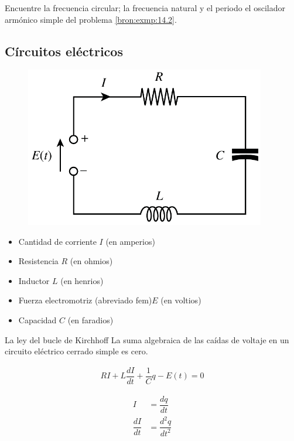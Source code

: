 \begin{problema}
	Encuentre la frecuencia circular; la frecuencia natural y el periodo el oscilador arm\'onico simple del problema \ref{bron:exmp:14.2}.
\end{problema}



\subsection{Círcuitos eléctricos}


\begin{figure}
	\includegraphics[height=7cm,keepaspectratio=true]{./edo/circuitos_electricos.png}
	\label{fig:circuitos}
\end{figure}



{}
\begin{itemize}
	\item Cantidad de corriente $I$ (en amperios)
	\item Resistencia $R$ (en ohmios)
	\item Inductor $L$ (en henrios)
	\item Fuerza electromotriz (abreviado fem)$E$ (en voltios)
	\item Capacidad $C$ (en faradios)
\end{itemize}


{La ley del bucle de Kirchhoff}	
La suma algebraica de las caídas de voltaje en un circuito eléctrico cerrado simple es cero.


{}
\begin{align*}
	RI + L\dfrac{dI}{dt}+\dfrac{1}{C}q-E(t)=0
\end{align*}


{}
\begin{align*}
	I&=\dfrac{dq}{dt}\\
	\dfrac{dI}{dt}&=\dfrac{d^{2}q}{dt^{2}}
\end{align*}



